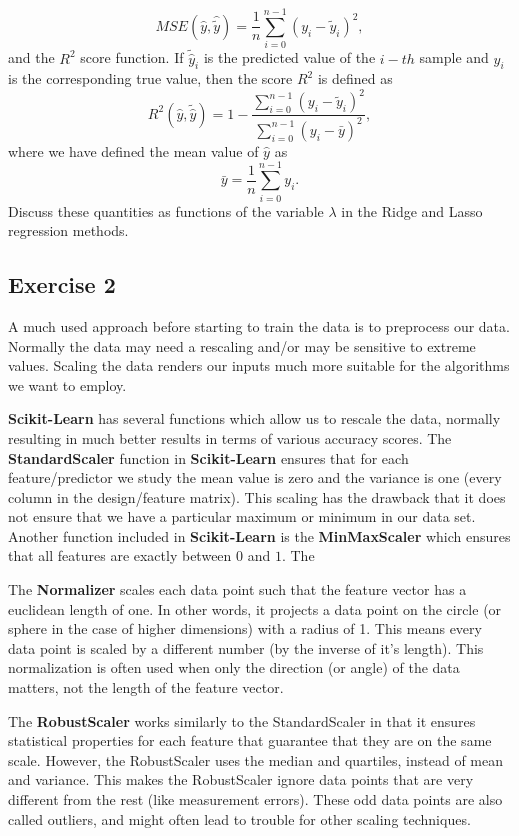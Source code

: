 \documentclass[%
oneside,                 %
final,                   %
10pt]{article}
\begin{document}
\noindent
\[ MSE(\hat{y},\hat{\tilde{y}}) = \frac{1}{n}
\sum_{i=0}^{n-1}(y_i-\tilde{y}_i)^2, 
\] 
and the $R^2$ score function.
If $\tilde{\hat{y}}_i$ is the predicted value of the $i-th$ sample and $y_i$ is the corresponding true value, then the score $R^2$ is defined as
\[
R^2(\hat{y}, \tilde{\hat{y}}) = 1 - \frac{\sum_{i=0}^{n - 1} (y_i - \tilde{y}_i)^2}{\sum_{i=0}^{n - 1} (y_i - \bar{y})^2},
\]
where we have defined the mean value  of $\hat{y}$ as
\[
\bar{y} =  \frac{1}{n} \sum_{i=0}^{n - 1} y_i.
\]
Discuss these quantities as functions of the variable $\lambda$ in the Ridge and Lasso regression methods. 

\subsection{Exercise 2}


A much used approach before starting to train the data is  to preprocess our
data. Normally the data may need a rescaling and/or may be sensitive
to extreme values. Scaling the data renders our inputs much more
suitable for the algorithms we want to employ.

\textbf{Scikit-Learn} has several functions which allow us to rescale the
data, normally resulting in much better results in terms of various
accuracy scores.  The \textbf{StandardScaler} function in \textbf{Scikit-Learn}
ensures that for each feature/predictor we study the mean value is
zero and the variance is one (every column in the design/feature
matrix).  This scaling has the drawback that it does not ensure that
we have a particular maximum or minimum in our data set. Another
function included in \textbf{Scikit-Learn} is the \textbf{MinMaxScaler} which
ensures that all features are exactly between $0$ and $1$. The


The \textbf{Normalizer} scales each data
point such that the feature vector has a euclidean length of one. In other words, it
projects a data point on the circle (or sphere in the case of higher dimensions) with a
radius of 1. This means every data point is scaled by a different number (by the
inverse of it’s length).
This normalization is often used when only the direction (or angle) of the data matters,
not the length of the feature vector.

The \textbf{RobustScaler} works similarly to the StandardScaler in that it
ensures statistical properties for each feature that guarantee that
they are on the same scale. However, the RobustScaler uses the median
and quartiles, instead of mean and variance. This makes the
RobustScaler ignore data points that are very different from the rest
(like measurement errors). These odd data points are also called
outliers, and might often lead to trouble for other scaling
techniques.
\end{document}
